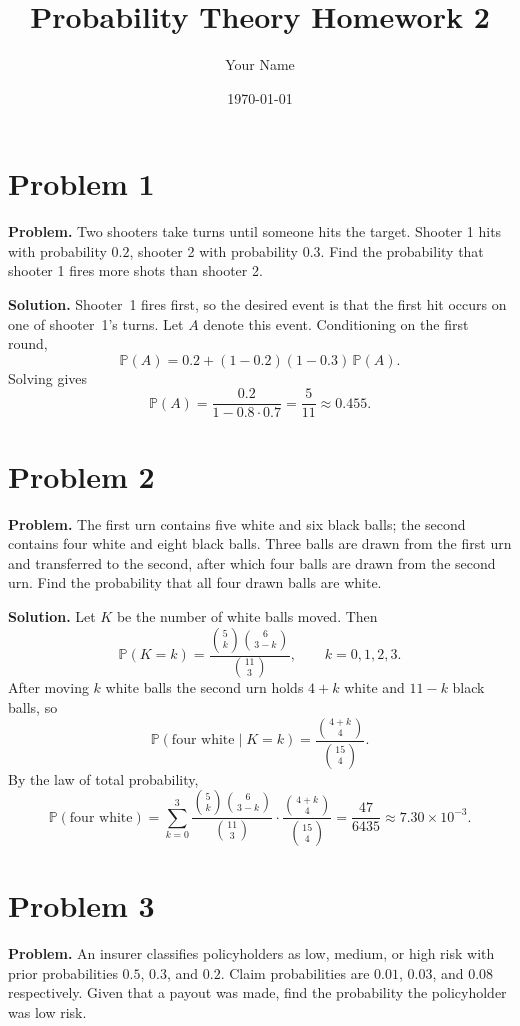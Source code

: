 \documentclass{article}
\title{Probability Theory Homework 2}
\author{Your Name}
\date{\today}
\begin{document}
\maketitle

\section{Problem 1}

\textbf{Problem.} Two shooters take turns until someone hits the target. Shooter 1 hits with probability $0.2$, shooter 2 with probability $0.3$. Find the probability that shooter 1 fires more shots than shooter 2.

\textbf{Solution.} Shooter~1 fires first, so the desired event is that the first hit occurs on one of shooter~1's turns. Let $A$ denote this event. Conditioning on the first round,
\[
\mathbb{P}(A) = 0.2 + (1-0.2)(1-0.3)\,\mathbb{P}(A).
\]
Solving gives
\[
\mathbb{P}(A) = \frac{0.2}{1-0.8\cdot 0.7} = \frac{5}{11} \approx 0.455.
\]

\section{Problem 2}

\textbf{Problem.} The first urn contains five white and six black balls; the second contains four white and eight black balls. Three balls are drawn from the first urn and transferred to the second, after which four balls are drawn from the second urn. Find the probability that all four drawn balls are white.

\textbf{Solution.} Let $K$ be the number of white balls moved. Then
\[
\mathbb{P}(K=k) = \frac{\binom{5}{k}\binom{6}{3-k}}{\binom{11}{3}},\qquad k=0,1,2,3.
\]
After moving $k$ white balls the second urn holds $4+k$ white and $11-k$ black balls, so
\[
\mathbb{P}(\text{four white}\mid K=k)=\frac{\binom{4+k}{4}}{\binom{15}{4}}.
\]
By the law of total probability,
\[
\mathbb{P}(\text{four white}) = \sum_{k=0}^{3} \frac{\binom{5}{k}\binom{6}{3-k}}{\binom{11}{3}} \cdot \frac{\binom{4+k}{4}}{\binom{15}{4}} = \frac{47}{6435} \approx 7.30\times 10^{-3}.
\]

\section{Problem 3}

\textbf{Problem.} An insurer classifies policyholders as low, medium, or high risk with prior probabilities $0.5$, $0.3$, and $0.2$. Claim probabilities are $0.01$, $0.03$, and $0.08$ respectively. Given that a payout was made, find the probability the policyholder was low risk.
\end{document}
